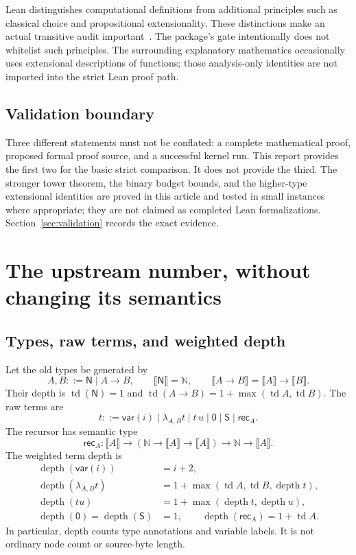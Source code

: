 \documentclass[11pt]{article}
\theoremstyle{definition}
\newcommand{\N}{\mathbb N}
\newcommand{\tyN}{\mathsf N}
\newcommand{\depth}{\operatorname{depth}}
\newcommand{\td}{\operatorname{td}}
\newcommand{\Sc}{\mathsf S}
\newcommand{\Rc}{\mathsf{rec}}
\newcommand{\sem}[1]{\llbracket #1\rrbracket}
\begin{document}
Lean distinguishes computational definitions from additional principles such
as classical choice and propositional extensionality. These distinctions make
an actual transitive audit important~\cite{leanaxioms}. The package's gate
intentionally does not whitelist such principles. The surrounding explanatory
mathematics occasionally uses extensional descriptions of functions; those
analysis-only identities are not imported into the strict Lean proof path.

\subsection{Validation boundary}

Three different statements must not be conflated: a complete mathematical
proof, proposed formal proof source, and a successful kernel run. This report
provides the first two for the basic strict comparison. It does not provide
the third. The stronger tower theorem, the binary budget bounds, and the
higher-type extensional identities are proved in this article and tested in
small instances where appropriate; they are not claimed as completed Lean
formalizations. Section~\ref{sec:validation} records the exact evidence.

\section{The upstream number, without changing its semantics}
\label{sec:legacy}

\subsection{Types, raw terms, and weighted depth}

Let the old types be generated by
\[
 A,B ::= \tyN \mid A\to B,
 \qquad \sem{\tyN}=\N,\qquad \sem{A\to B}=\sem A\to\sem B.
\]
Their depth is $\td(\tyN)=1$ and
$\td(A\to B)=1+\max(\td A,\td B)$.
The raw terms are
\[
 t ::= \mathsf{var}(i)\mid\lambda_{A,B}t\mid t\,u
       \mid\mathsf 0\mid\Sc\mid\Rc_A .
\]
The recursor has semantic type
\[
 \Rc_A:\sem A\to(\N\to\sem A\to\sem A)\to\N\to\sem A.
\]
The weighted term depth is
\begin{align*}
 \depth(\mathsf{var}(i))&=i+2,\\
 \depth(\lambda_{A,B}t)&=1+\max(\td A,\td B,\depth t),\\
 \depth(tu)&=1+\max(\depth t,\depth u),\\
 \depth(\mathsf0)=\depth(\Sc)&=1,\qquad
 \depth(\Rc_A)=1+\td A.
\end{align*}
In particular, depth counts type annotations and variable labels. It is not
ordinary node count or source-byte length.
\end{document}
